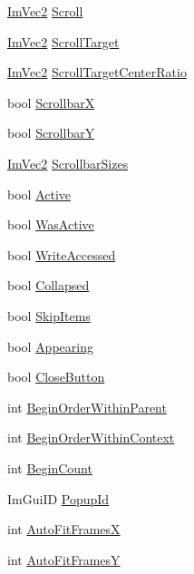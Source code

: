\begin{DoxyCompactItemize}
\hyperlink{struct_im_vec2}{Im\+Vec2} \hyperlink{struct_im_gui_window_abf20537560b9454a1e39667b8f9e7ff2}{Scroll}
\item 
\hyperlink{struct_im_vec2}{Im\+Vec2} \hyperlink{struct_im_gui_window_a77f86bed14712f73d9fb4b8ba2c4d040}{Scroll\+Target}
\item 
\hyperlink{struct_im_vec2}{Im\+Vec2} \hyperlink{struct_im_gui_window_a41f1fde48e59626ea1d19d098cd8ad84}{Scroll\+Target\+Center\+Ratio}
\item 
bool \hyperlink{struct_im_gui_window_a5aeada04ca67b0522677f5cdf5c6b483}{ScrollbarX}
\item 
bool \hyperlink{struct_im_gui_window_ae95f526590e0777de9cf26581a7d6702}{ScrollbarY}
\item 
\hyperlink{struct_im_vec2}{Im\+Vec2} \hyperlink{struct_im_gui_window_a040ebb8ac7de890df6cb6bfe048a72d5}{Scrollbar\+Sizes}
\item 
bool \hyperlink{struct_im_gui_window_a42f141fa0eed059176cb4360df1b1eb2}{Active}
\item 
bool \hyperlink{struct_im_gui_window_ab346ec3a2f305948af05ec1871610a8f}{Was\+Active}
\item 
bool \hyperlink{struct_im_gui_window_a3c29e870f485d115e7715e149c4dfc4d}{Write\+Accessed}
\item 
bool \hyperlink{struct_im_gui_window_a04e6b533b2401d1c7e78b47e31538e7b}{Collapsed}
\item 
bool \hyperlink{struct_im_gui_window_ac620c64ec2897561f719db266f5e9b05}{Skip\+Items}
\item 
bool \hyperlink{struct_im_gui_window_a158ebb04d20cac09504fdbc4994eb017}{Appearing}
\item 
bool \hyperlink{struct_im_gui_window_afef9f9e2a79626e28acd459e4cfe83e7}{Close\+Button}
\item 
int \hyperlink{struct_im_gui_window_a9299370fd06dff8c36988743db5b90fd}{Begin\+Order\+Within\+Parent}
\item 
int \hyperlink{struct_im_gui_window_ae0cb2f2346c1a9264210626a99997506}{Begin\+Order\+Within\+Context}
\item 
int \hyperlink{struct_im_gui_window_aa27229a425dc17303be1cd8f4a61c17f}{Begin\+Count}
\item 
Im\+Gui\+ID \hyperlink{struct_im_gui_window_a319c5f43fa4ee9c76b8a6e551e0c0869}{Popup\+Id}
\item 
int \hyperlink{struct_im_gui_window_a4ec83127718940ff4e0e268dc45232cf}{Auto\+Fit\+FramesX}
\item 
int \hyperlink{struct_im_gui_window_a081b945f503a33c5fc686ff2ea9985f0}{Auto\+Fit\+FramesY}

\end{DoxyCompactItemize}
